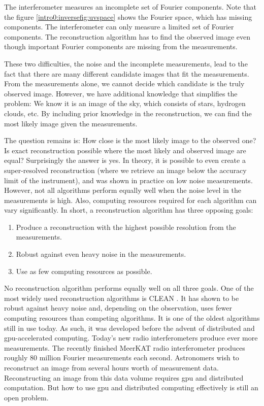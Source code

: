 The interferometer measures an incomplete set of Fourier components. Note that the figure \ref{intro0:inversefig:uvspace} shows the Fourier space, which has missing components. The interferometer can only measure a limited set of Fourier components. The reconstruction algorithm has to find the observed image even though important Fourier components are missing from the measurements.

These two difficulties, the noise and the incomplete measurements, lead to the fact that there are many different candidate images that fit the measurements. From the measurements alone, we cannot decide which candidate is the truly observed image. However, we have additional knowledge that simplifies the problem: We know it is an image of the sky, which consists of stars, hydrogen clouds, etc. By including prior knowledge in the reconstruction, we can find the most likely image given the measurements. 

The question remains is: How close is the most likely image to the observed one? Is exact reconstruction possible where the most likely and observed image are equal? Surprisingly the answer is yes. In theory, it is possible to even create a super-resolved reconstruction (where we retrieve an image below the accuracy limit of the instrument)\cite{candes2006robust,donoho2006compressed}, and was shown in practice on low noise measurements\cite{dabbech2018cygnus, dabbech2015moresane}. However, not all algorithms perform equally well when the noise level in the measurements is high. Also, computing resources required for each algorithm can vary significantly. In short, a reconstruction algorithm has three opposing goals:
\begin{enumerate}
	\item Produce a reconstruction with the highest possible resolution from the measurements.
	\item Robust against even heavy noise in the measurements.
	\item Use as few computing resources as possible.
\end{enumerate}

No reconstruction algorithm performs equally well on all three goals. One of the most widely used reconstruction algorithms is CLEAN \cite{hogbom1974aperture, rau2011multi}. It has shown to be robust against heavy noise and, depending on the observation, uses fewer computing resources than competing algorithms\cite{offringa2017optimized}. It is one of the oldest algorithms still in use today. As such, it was developed before the advent of distributed and gpu-accelerated computing. Today's new radio interferometers produce ever more measurements. The recently finished MeerKAT radio interferometer produces roughly 80 million Fourier measurements each second. Astronomers wish to reconstruct an image from several hours worth of measurement data. Reconstructing an image from this data volume requires gpu and distributed computation. But how to use gpu and distributed computing effectively is still an open problem.

